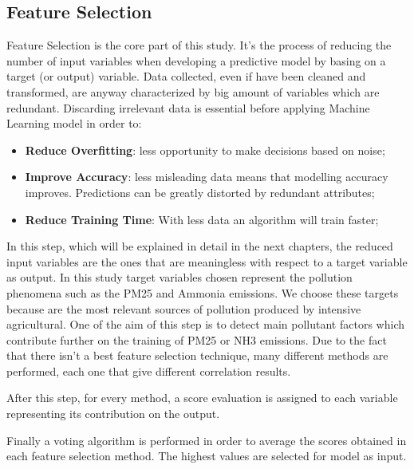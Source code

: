 \subsection{Feature Selection}
Feature Selection is the core part of this study. It's the process of reducing the number of input variables when developing a predictive model by basing on a target (or output) variable. 
Data collected, even if have been cleaned and transformed, are anyway characterized by big amount of variables which are redundant.
Discarding irrelevant data is essential before applying Machine Learning model in order to:
\begin{itemize}
\item \textbf{Reduce Overfitting}: less opportunity to make decisions based on noise;
\item \textbf{Improve Accuracy}: less misleading data means that modelling accuracy improves. Predictions can be greatly distorted by redundant attributes;
\item \textbf{Reduce Training Time}: With less data an algorithm will train faster;
\end{itemize}
In this step, which will be explained in detail in the next chapters, the reduced input variables are the ones that are meaningless with respect to a target variable as output. \newline
In this study target variables chosen represent the pollution phenomena such as the PM25 and Ammonia emissions. We choose these targets because are the most relevant sources of pollution produced by intensive agricultural.\newline
One of the aim of this step is to detect main pollutant factors which contribute further on the training of PM25 or NH3 emissions.
Due to the fact that there isn’t a best feature selection technique, many different methods are performed, each one that give different correlation results.\par
After this step, for every method, a score evaluation is assigned to each variable representing its contribution on the output.\par
Finally a voting algorithm is performed in order to average the scores obtained in each feature selection method. 
The highest values are selected for model as input.
